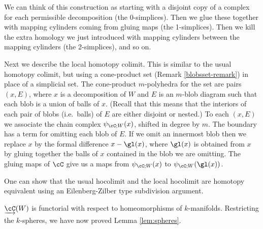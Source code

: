 We can think of this construction as starting with a disjoint copy of a complex for each
permissible decomposition (the 0-simplices).
Then we glue these together with mapping cylinders coming from gluing maps
(the 1-simplices).
Then we kill the extra homology we just introduced with mapping 
cylinders between the mapping cylinders (the 2-simplices), and so on.

Next we describe the local homotopy colimit.
This is similar to the usual homotopy colimit, but using
a cone-product set (Remark \ref{blobsset-remark}) in place of a simplicial set.
The cone-product $m$-polyhedra for the set are pairs $(x, E)$, where $x$ is a decomposition of $W$
and $E$ is an $m$-blob diagram such that each blob is a union of balls of $x$.
(Recall that this means that the interiors of
each pair of blobs (i.e.\ balls) of $E$ are either disjoint or nested.)
To each $(x, E)$ we associate the chain complex $\psi_{\cC;W}(x)$, shifted in degree by $m$.
The boundary has a term for omitting each blob of $E$.
If we omit an innermost blob then we replace $x$ by the formal difference $x - \gl(x)$, where
$\gl(x)$ is obtained from $x$ by gluing together the balls of $x$ contained in the blob we are omitting.
The gluing maps of $\cC$ give us a maps from $\psi_{\cC;W}(x)$ to $\psi_{\cC;W}(\gl(x))$.

One can show that the usual hocolimit and the local hocolimit are homotopy equivalent using an 
Eilenberg-Zilber type subdivision argument.

\medskip

$\cl{\cC}(W)$ is functorial with respect to homeomorphisms of $k$-manifolds. 
Restricting the $k$-spheres, we have now proved Lemma \ref{lem:spheres}.

